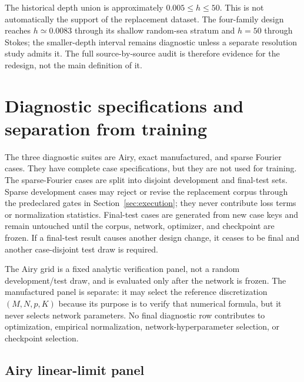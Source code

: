 \documentclass[11pt]{article}
\begin{document}
The historical depth union is approximately $0.005\leq h\leq50$.  This is
not automatically the support of the replacement dataset.  The four-family
design reaches $h\simeq0.0083$ through its shallow random-sea stratum and
$h=50$ through
Stokes; the smaller-depth interval remains diagnostic unless a separate
resolution study admits it.  The full source-by-source audit is therefore
evidence for the redesign, not the main definition of it.


\section{Diagnostic specifications and separation from training}
\label{sec:diagnostic-specifications}

The three diagnostic suites are Airy, exact manufactured, and sparse Fourier
cases.  They have complete case specifications, but they are not used for
training.  The sparse-Fourier cases are split into disjoint development and
final-test sets.
Sparse development cases may reject or revise the replacement corpus through the
predeclared gates in Section~\ref{sec:execution}; they never contribute loss
terms or normalization statistics.  Final-test cases are generated from new
case keys and remain untouched until the corpus, network, optimizer, and
checkpoint are frozen.  If a final-test result causes another design change,
it ceases to be final and another case-disjoint test draw is required.

The Airy grid is a fixed analytic verification panel, not a random
development/test draw, and is evaluated only after the network is frozen.
The manufactured panel is separate: it may select the reference
discretization $(M,N,p,K)$ because its purpose is to verify that numerical
formula, but it never selects network parameters.  No final diagnostic row
contributes to optimization, empirical normalization, network-hyperparameter
selection, or checkpoint selection.

\subsection{Airy linear-limit panel}
\end{document}
